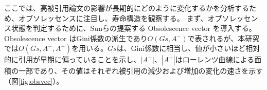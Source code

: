 ここでは、高被引用論文の影響が長期的にどのように変化するかを分析するため、オブソレッセンスに注目し、寿命構造を観察する。
まず、オブソレッセンス状態を判定するために、Sun\cite{SUn1}らの提案する Obsolescence vector を導入する。
Obsolescence vector はGini係数の派生であり$O(Gs,A^-)$で表されるが、本研究では$O(Gs,A^-,A^+)$を用いる。$Gs$は、Gini係数に相当し、値が小さいほど相対的に引用が早期に偏っていることを示し、$|A^-|$、$|A^+|$はローレンツ曲線による面積の一部であり、その値はそれぞれ被引用の減少および増加の変化の速さを示す（図\ref{fig:obsvec}）。
